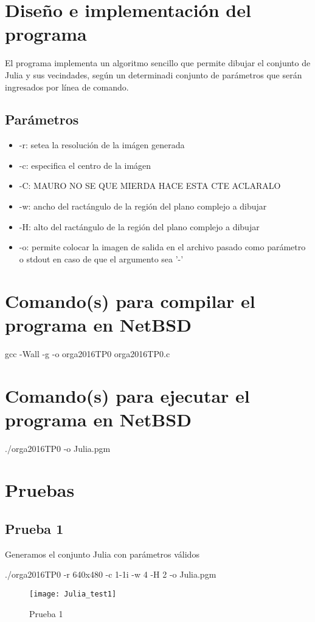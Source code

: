 \documentclass{article}
\begin{document}
\section{Diseño e implementaci\'on del programa}
\indent El programa implementa un algoritmo sencillo que permite dibujar el conjunto de Julia y sus vecindades, seg\'un un determinadi conjunto de par\'ametros que ser\'an ingresados por l\'inea de comando. 

\subsection{Par\'ametros}
\begin{itemize}
    \item -r: setea la resoluci\'on de la im\'agen generada
    \item -c: especifica el centro de la im\'agen
    \item -C: MAURO NO SE QUE MIERDA HACE ESTA CTE ACLARALO
    \item -w: ancho del ract\'angulo de la regi\'on del plano complejo a dibujar
    \item -H: alto del ract\'angulo de la regi\'on del plano complejo a dibujar
    \item -o: permite colocar la imagen de salida en el archivo pasado como par\'{a}metro o stdout en caso de que el argumento sea '-'
\end{itemize}
 
\section{Comando(s) para compilar el programa en NetBSD}
    gcc -Wall -g -o orga2016TP0 orga2016TP0.c    
\section{Comando(s) para ejecutar el programa en NetBSD}
    ./orga2016TP0 -o Julia.pgm
    
\section{Pruebas}
\subsection*{Prueba 1}
Generamos el conjunto Julia con par\'ametros v\'alidos
\begin{center}
    ./orga2016TP0 -r 640x480 -c 1-1i -w 4 -H 2 -o Julia.pgm
\end{center}
\begin{figure}[H]
  \begin{center}
  	\texttt{[image: Julia\_test1]}
  \end{center}
  \caption{Prueba 1}
\end{figure}
\end{document}
